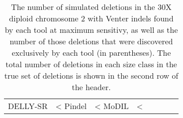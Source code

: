 \begin{table}[t]
\begin{center}
\begin{tabular}{rrr|rrrrr}
  DELLY-SR           & <%
  Pindel           & <%
  MoDIL           & <%
   \hline
\end{tabular}
\end{center}
\caption{The number of simulated deletions in the 30X diploid chromosome 2 with Venter indels found by each tool at maximum sensitivy, as well as the number of those deletions that were discovered exclusively by each tool (in parentheses). The total number of deletions in each size class in the true set of deletions is shown in the second row of the header.}
\label{chr2DeletionPredsMaxSensitivity}
\end{table}

